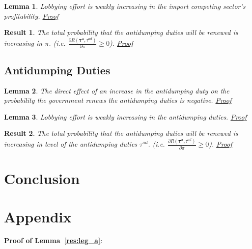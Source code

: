 \documentclass[10pt]{article}
\newtheorem{lemma}{Lemma}
\newtheorem{result}{Result}
\newcommand{\bta}{\bm{\tau^a}}
\newcommand{\tad}{\tau^{ad}}
\begin{document}
\begin{lemma}
  Lobbying effort is weakly increasing in the import competing sector's profitability. \hyperlink{Pr_pi_indir}{Proof}
  \label{res:pi_indir}
\end{lemma}


\begin{result}
	The total probability that the antidumping duties will be renewed is increasing in $\pi$. (i.e. $\frac{\partial R(\bta,\tad)}{\partial  \pi} \geq 0$). \hyperlink{Pr_pi_total}{Proof}
	\label{res:pi_total}
\end{result}




\subsection{Antidumping Duties}
\label{sec:tad}


\begin{lemma}
  The direct effect of an increase in the antidumping duty on the probability the government renews the antidumping duties is negative. \hyperlink{Pr_tad_dir}{Proof}
  \label{res:tad_dir}
\end{lemma}


\begin{lemma}
  Lobbying effort is weakly increasing in the antidumping duties. \hyperlink{Pr_tad_indir}{Proof}
  \label{res:tad_indir}
\end{lemma}


\begin{result}
	The total probability that the antidumping duties will be renewed is increasing in level of the antidumping duties $\tad$. (i.e. $\frac{\partial R(\bta,\tad)}{\partial  \pi} \geq 0$). \hyperlink{Pr_tad_total}{Proof}
	\label{res:tad_total}
\end{result}





\section{Conclusion}
\label{sec:concl}
			




\section{Appendix}
\label{sec:appendix}
\noindent \textbf{\hypertarget{Pr_leg_a}{Proof of Lemma~\ref{res:leg_a}}}:
\end{document}
